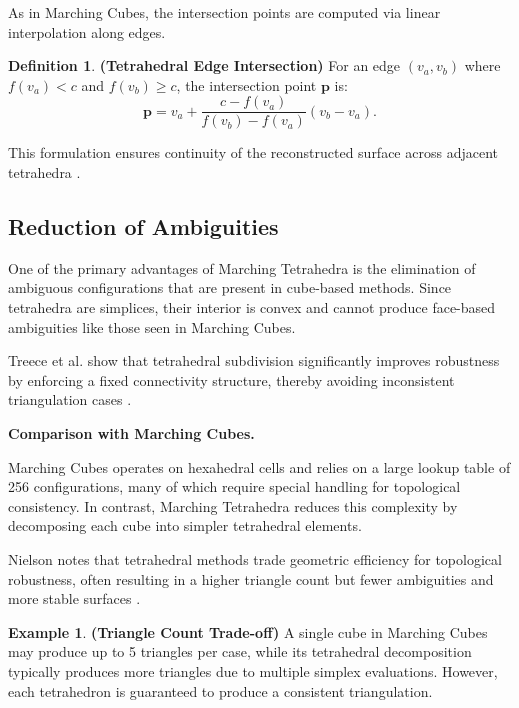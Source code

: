 \documentclass[12pt, a4paper, oneside]{book}
\theoremstyle{plain}
\theoremstyle{definition}
\newtheorem{definition}[theorem]{Definition}
\newtheorem{example}[theorem]{Example}
\theoremstyle{remark}
\theoremstyle{definition}
\begin{document}
As in Marching Cubes, the intersection points are computed via linear interpolation along edges.

\begin{definition}
    \textbf{(Tetrahedral Edge Intersection)}
For an edge $(v_a, v_b)$ where $f(v_a) < c$ and $f(v_b) \geq c$, the intersection point $\mathbf{p}$ is:
\[
\mathbf{p} = v_a + \frac{c - f(v_a)}{f(v_b) - f(v_a)} (v_b - v_a).
\]
\end{definition}


This formulation ensures continuity of the reconstructed surface across adjacent tetrahedra \cite{bloomenthal1997introduction}.

\vspace{0.5em}

\subsection{Reduction of Ambiguities}

One of the primary advantages of Marching Tetrahedra is the elimination of ambiguous configurations that are present in cube-based methods. Since tetrahedra are simplices, their interior is convex and cannot produce face-based ambiguities like those seen in Marching Cubes.

Treece et al. show that tetrahedral subdivision significantly improves robustness by enforcing a fixed connectivity structure, thereby avoiding inconsistent triangulation cases \cite{treece1999regularised}.

\vspace{0.5em}

\textbf{Comparison with Marching Cubes.}

Marching Cubes operates on hexahedral cells and relies on a large lookup table of 256 configurations, many of which require special handling for topological consistency. In contrast, Marching Tetrahedra reduces this complexity by decomposing each cube into simpler tetrahedral elements.

Nielson notes that tetrahedral methods trade geometric efficiency for topological robustness, often resulting in a higher triangle count but fewer ambiguities and more stable surfaces \cite{nielson2008dual}.

\begin{example}
    \textbf{(Triangle Count Trade-off)}
A single cube in Marching Cubes may produce up to 5 triangles per case, while its tetrahedral decomposition typically produces more triangles due to multiple simplex evaluations. However, each tetrahedron is guaranteed to produce a consistent triangulation.
\end{example}
\end{document}
